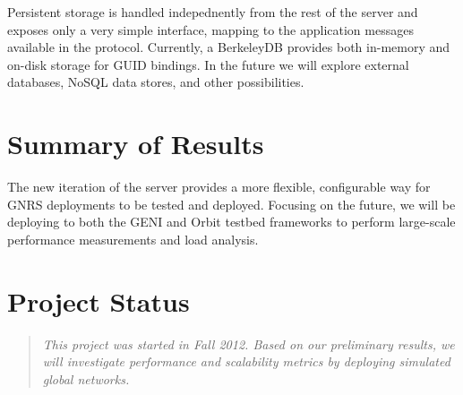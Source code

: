 \documentclass[conference, 11pt]{IEEEtran}
\begin{document}
Persistent storage is handled indepednently from the rest of the server and
exposes only a very simple interface, mapping to the application messages
available in the protocol.  Currently, a BerkeleyDB provides both in-memory
and on-disk storage for GUID bindings.  In the future we will explore external
databases, NoSQL data stores, and other possibilities.

\section{Summary of Results}
The new iteration of the server provides a more flexible, configurable way for
GNRS deployments to be tested and deployed. Focusing on the future, we will be
deploying to both the GENI and Orbit testbed frameworks to perform large-scale
performance measurements and load analysis.

\section{Project Status}

\begin{quotation}
\em This project was started in Fall 2012. Based on our preliminary
results, we will investigate performance and scalability metrics by deploying
simulated global networks.
\end{quotation} 



\end{document}
